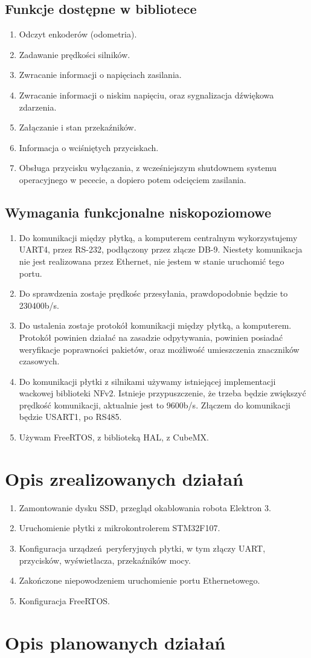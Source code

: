 \documentclass[10pt,a4paper]{article}
\begin{document}
	\subsection{Funkcje dostępne w bibliotece}
	\begin{enumerate}
		\item Odczyt enkoderów (odometria).
		\item Zadawanie prędkości silników.
		\item Zwracanie informacji o napięciach zasilania.
		\item Zwracanie informacji o niskim napięciu, oraz sygnalizacja dźwiękowa zdarzenia.
		\item Załączanie i stan przekaźników.
		\item Informacja o wciśniętych przyciskach.
		\item Obsługa przycisku wyłączania, z wcześniejszym shutdownem systemu operacyjnego w pececie, a dopiero potem odcięciem zasilania.
	\end{enumerate}
	\subsection{Wymagania funkcjonalne niskopoziomowe}
	\begin{enumerate}
		\item Do komunikacji między płytką, a komputerem centralnym wykorzystujemy UART4, przez RS-232, podłączony przez złącze DB-9. Niestety komunikacja nie jest realizowana przez Ethernet, nie jestem w stanie uruchomić tego portu.
		\item Do sprawdzenia zostaje prędkośc przesyłania, prawdopodobnie będzie to 230400b/s.
		\item Do ustalenia zostaje protokół komunikacji między płytką, a komputerem. Protokół powinien działać na zasadzie odpytywania, powinien posiadać weryfikacje poprawności pakietów, oraz możliwość umieszczenia znaczników czasowych.
		\item Do komunikacji płytki z silnikami używamy istniejącej implementacji wackowej biblioteki NFv2. Istnieje przypuszczenie, że trzeba będzie zwiększyć prędkość komunikacji, aktualnie jest to 9600b/s. Złączem do komunikacji będzie USART1, po RS485.
		\item Używam FreeRTOS, z biblioteką HAL, z CubeMX.
	\end{enumerate}
	\section{Opis zrealizowanych działań}
	\begin{enumerate}
		\item Zamontowanie dysku SSD, przegląd okablowania robota Elektron 3.
		\item Uruchomienie płytki z mikrokontrolerem STM32F107.
		\item Konfiguracja urządzeń peryferyjnych płytki, w tym złączy UART, przycisków, wyświetlacza, przekaźników mocy.
		\item Zakończone niepowodzeniem uruchomienie portu Ethernetowego.
		\item Konfiguracja FreeRTOS. 
	\end{enumerate}
	\section{Opis planowanych działań}
\end{document}
